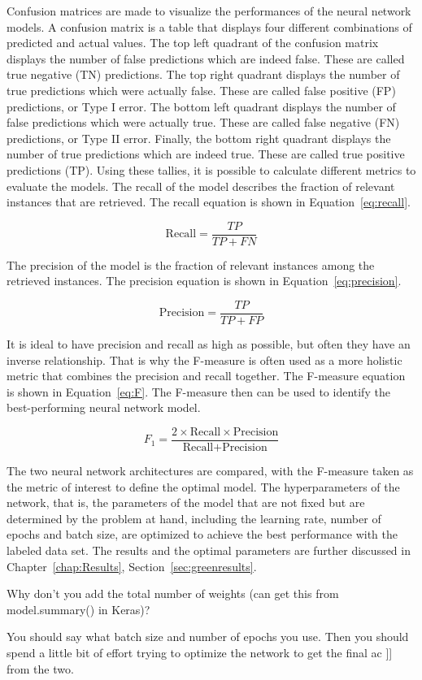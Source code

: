 Confusion matrices are made to visualize the performances of the neural network models. A confusion matrix is a table that displays four different combinations of predicted and actual values. The top left quadrant of the confusion matrix displays the number of false predictions which are indeed false. These are called true negative (TN) predictions. The top right quadrant displays the number of true predictions which were actually false. These are called false positive (FP) predictions, or Type I error. The bottom left quadrant displays the number of false predictions which were actually true. These are called false negative (FN) predictions, or Type II error. Finally, the bottom right quadrant displays the number of true predictions which are indeed true. These are called true positive predictions (TP). Using these tallies, it is possible to calculate different metrics to evaluate the models. The recall of the model describes the fraction of relevant instances that are retrieved. The recall equation is shown in Equation~\ref{eq:recall}.

\begin{equation}
\text{Recall} = \frac{TP}{TP + FN}
\label{eq:recall}
\end{equation}

The precision of the model is the fraction of relevant instances among the retrieved instances. The precision equation is shown in Equation~\ref{eq:precision}.

\begin{equation}
\text{Precision} = \frac{TP}{TP + FP}
\label{eq:precision}
\end{equation}

It is ideal to have precision and recall as high as possible, but often they have an inverse relationship. That is why the F-measure is often used as a more holistic metric that combines the precision and recall together. The F-measure equation is shown in Equation~\ref{eq:F}. The F-measure then can be used to identify the best-performing neural network model. 

\begin{equation}
F_{1} = \frac{2 \times \text{Recall} \times \text{Precision}}{\text{Recall} + \text{Precision}}
\label{eq:F}
\end{equation}

The two neural network architectures are compared, with the F-measure taken as the metric of interest to define the optimal model. The hyperparameters of the network, that is, the parameters of the model that are not fixed but are determined by the problem at hand, including the learning rate, number of epochs and batch size, are optimized to achieve the best performance with the labeled data set. The results and the optimal parameters are further discussed in Chapter~\ref{chap:Results}, Section~\ref{sec:greenresults}.

Why don't you add the total number of weights (can get this from model.summary() in Keras)?

You should say what batch size and number of epochs you use. Then you should spend a little bit of effort trying to optimize the network to get the final ac ]] from the two.




